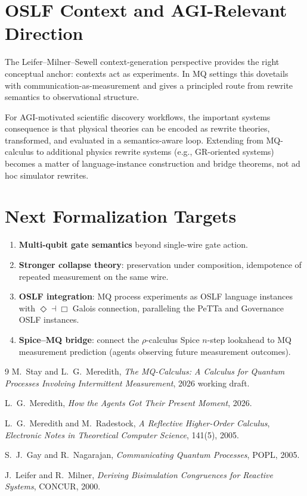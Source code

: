 \documentclass[11pt]{article}
\begin{document}
\section{OSLF Context and AGI-Relevant Direction}
The Leifer--Milner--Sewell context-generation perspective provides the right conceptual anchor: contexts act as experiments. In MQ settings this dovetails with communication-as-measurement and gives a principled route from rewrite semantics to observational structure.

For AGI-motivated scientific discovery workflows, the important systems consequence is that physical theories can be encoded as rewrite theories, transformed, and evaluated in a semantics-aware loop. Extending from MQ-calculus to additional physics rewrite systems (e.g., GR-oriented systems) becomes a matter of language-instance construction and bridge theorems, not ad hoc simulator rewrites.

\section{Next Formalization Targets}
\begin{enumerate}[leftmargin=1.5em]
  \item \textbf{Multi-qubit gate semantics} beyond single-wire gate action.
  \item \textbf{Stronger collapse theory}: preservation under composition,
    idempotence of repeated measurement on the same wire.
  \item \textbf{OSLF integration}: MQ process experiments as OSLF language
    instances with $\Diamond \dashv \Box$ Galois connection, paralleling the
    PeTTa and Governance OSLF instances.
  \item \textbf{Spice--MQ bridge}: connect the $\rho$-calculus Spice
    $n$-step lookahead to MQ measurement prediction (agents observing
    future measurement outcomes).
\end{enumerate}

\begin{thebibliography}{9}
M.~Stay and L.~G.~Meredith,
\emph{The MQ-Calculus: A Calculus for Quantum Processes Involving Intermittent
  Measurement},
2026 working draft.

L.~G.~Meredith,
\emph{How the Agents Got Their Present Moment},
2026.

L.~G.~Meredith and M.~Radestock,
\emph{A Reflective Higher-Order Calculus},
\textit{Electronic Notes in Theoretical Computer Science}, 141(5), 2005.

S.~J.~Gay and R.~Nagarajan,
\emph{Communicating Quantum Processes},
POPL, 2005.

J.~Leifer and R.~Milner,
\emph{Deriving Bisimulation Congruences for Reactive Systems},
CONCUR, 2000.
\end{thebibliography}
\end{document}

